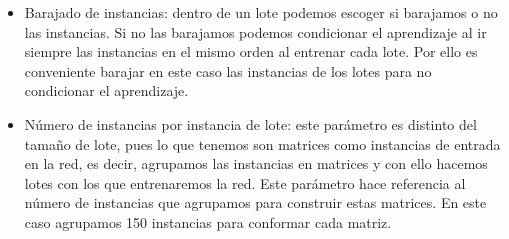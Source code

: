 \begin{itemize}
	\item Barajado de instancias: dentro de un lote podemos escoger si barajamos o no las instancias. Si no las barajamos podemos condicionar el aprendizaje al ir siempre las instancias en el mismo orden al entrenar cada lote. Por ello es conveniente barajar en este caso las instancias de los lotes para no condicionar el aprendizaje.
	\item Número de instancias por instancia de lote: este parámetro es distinto del tamaño de lote, pues lo que tenemos son matrices como instancias de entrada en la red, es decir, agrupamos las instancias en matrices y con ello hacemos lotes con los que entrenaremos la red. Este parámetro hace referencia al número de instancias que agrupamos para construir estas matrices. En este caso agrupamos 150 instancias para conformar cada matriz.
\end{itemize}

